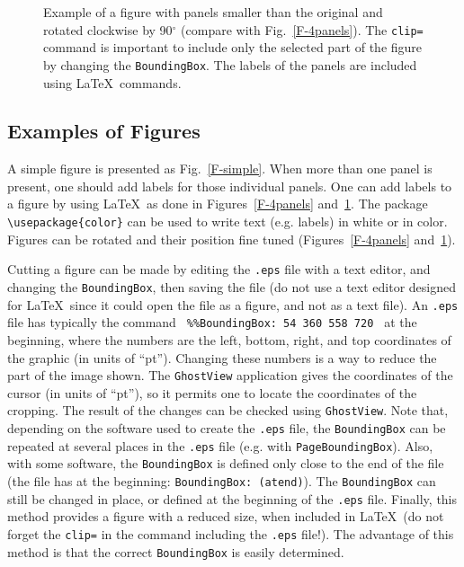 \documentclass[namedreferences,hyperref,optionalrh]{spr-sola}
\begin{document}
\begin{figure}
{      \hspace{0.122\textwidth}  \color{black}{(b)}
      \hspace{0.122\textwidth}  \color{white}{(c)}
      \hspace{0.122\textwidth}  \color{white}{(d)}
         \hfill}
     \vspace{0.36\textwidth}    %
\caption{Example of a figure with panels smaller
than the original and rotated clockwise by 90$^{\circ}$ 
(compare with Fig.~\ref{F-4panels}). The \texttt{clip=} 
command is important to include only the selected part of the figure 
by changing the \texttt{BoundingBox}. 
The labels of the panels are included using \LaTeX\ commands. 
        }
\label{F-rotate-cut}
\end{figure}
   

\subsection{Examples of Figures} %
\label{S-figures}
 A simple figure is presented as Fig.~\ref{F-simple}. When more
than one panel is present, one should add labels for those individual panels.
One can add labels to a figure by using \LaTeX\ as done
in Figures~\ref{F-4panels} and~\ref{F-rotate-cut}. 
The package \verb+\usepackage{color}+
can be used to write text (e.g. labels) in white or in color. 
Figures can be rotated and their position fine tuned 
(Figures~\ref{F-4panels} and~\ref{F-rotate-cut}).

  Cutting a figure can be made by editing the \texttt{.eps} 
file with a text editor, and changing the \texttt{BoundingBox}, 
then saving the file (do not use a text editor designed for \LaTeX\ since 
it could open the file as a figure, and not as a text file).
An \texttt{.eps} file has typically the command
\verb+ %%BoundingBox: 54 360 558 720 + 
at the beginning, where the numbers are the left, bottom, right, and top
coordinates of the graphic (in units of ``pt'').  
Changing these numbers is a way to reduce the part of the image shown. 
The \texttt{GhostView} application gives the coordinates
of the cursor (in units of ``pt''), so it permits one to locate the 
coordinates of the cropping. 
The result of the changes can be checked using \texttt{GhostView}. 
 Note that, depending on the software used to create the \texttt{.eps} file, 
the \texttt{BoundingBox} can be repeated at several places in the
\texttt{.eps} file (e.g. with \texttt{PageBoundingBox}). 
Also, with some software,
the \texttt{BoundingBox} is defined only close to the end of the file
(the file has at the beginning: \texttt{BoundingBox: (atend)}).
The \texttt{BoundingBox} can still be changed
in place, or defined at the beginning of the \texttt{.eps} file. 
   Finally, this method provides a figure with a reduced size, when
included in \LaTeX\ (do not forget the \texttt{clip=} 
in the command including the \texttt{.eps} file!).     
The advantage of this method is that the correct \texttt{BoundingBox}
is easily determined.
\end{document}

